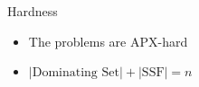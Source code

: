 \begin{frame}[<+>]{Hardness}
\begin{itemize}
  \item The problems are APX-hard
  \item $|\text{Dominating Set}| + |\text{SSF}| = n$
\end{itemize}
\onslide<+>
\begin{center}

\end{center}
\end{frame}